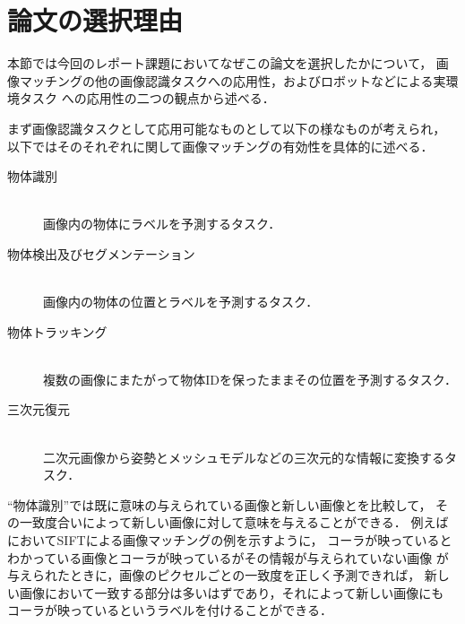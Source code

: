\section{論文の選択理由}

本節では今回のレポート課題においてなぜこの論文を選択したかについて，
画像マッチングの他の画像認識タスクへの応用性，およびロボットなどによる実環境タスク
への応用性の二つの観点から述べる．

まず画像認識タスクとして応用可能なものとして以下の様なものが考えられ，
以下ではそのそれぞれに関して画像マッチングの有効性を具体的に述べる．

\begin{description}
  \item[物体識別]\mbox{}\\
    画像内の物体にラベルを予測するタスク．
  \item[物体検出及びセグメンテーション]\mbox{}\\
    画像内の物体の位置とラベルを予測するタスク．
  \item[物体トラッキング]\mbox{}\\
    複数の画像にまたがって物体IDを保ったままその位置を予測するタスク．
  \item[三次元復元]\mbox{}\\
    二次元画像から姿勢とメッシュモデルなどの三次元的な情報に変換するタスク．
\end{description}

``物体識別''では既に意味の与えられている画像と新しい画像とを比較して，
その一致度合いによって新しい画像に対して意味を与えることができる．
例えば
においてSIFTによる画像マッチングの例を示すように，
コーラが映っているとわかっている画像とコーラが映っているがその情報が与えられていない画像
が与えられたときに，画像のピクセルごとの一致度を正しく予測できれば，
新しい画像において一致する部分は多いはずであり，それによって新しい画像にも
コーラが映っているというラベルを付けることができる．

